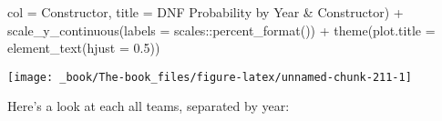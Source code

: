 \documentclass[
]{book}
\newenvironment{Shaded}{\begin{snugshade}}{\end{snugshade}}
\newcommand{\AttributeTok}[1]{\textcolor[rgb]{0.77,0.63,0.00}{#1}}
\newcommand{\FloatTok}[1]{\textcolor[rgb]{0.00,0.00,0.81}{#1}}
\newcommand{\FunctionTok}[1]{\textcolor[rgb]{0.00,0.00,0.00}{#1}}
\newcommand{\NormalTok}[1]{#1}
\newcommand{\SpecialCharTok}[1]{\textcolor[rgb]{0.00,0.00,0.00}{#1}}
\newcommand{\StringTok}[1]{\textcolor[rgb]{0.31,0.60,0.02}{#1}}
\begin{document}
\begin{Shaded}
\begin{Highlighting}[]
       \AttributeTok{col =} \StringTok{\textquotesingle{}Constructor\textquotesingle{}}\NormalTok{,}
       \AttributeTok{title =} \StringTok{\textquotesingle{}DNF Probability by Year \& Constructor\textquotesingle{}}\NormalTok{) }\SpecialCharTok{+}
\FunctionTok{scale\_y\_continuous}\NormalTok{(}\AttributeTok{labels =}\NormalTok{ scales}\SpecialCharTok{::}\FunctionTok{percent\_format}\NormalTok{()) }\SpecialCharTok{+}
  \FunctionTok{theme}\NormalTok{(}\AttributeTok{plot.title =} \FunctionTok{element\_text}\NormalTok{(}\AttributeTok{hjust =} \FloatTok{0.5}\NormalTok{))}
\end{Highlighting}
\end{Shaded}

\begin{center}\texttt{[image: \_book/The-book\_files/figure-latex/unnamed-chunk-211-1]} \end{center}

Here's a look at each all teams, separated by year:
\end{document}
